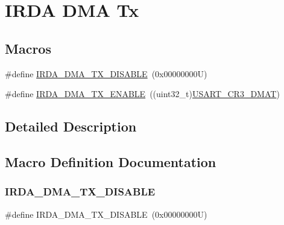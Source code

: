 \hypertarget{group___i_r_d_a___d_m_a___tx}{}\section{I\+R\+DA D\+MA Tx}
\label{group___i_r_d_a___d_m_a___tx}
\subsection*{Macros}
\begin{DoxyCompactItemize}
\item 
\#define \hyperlink{group___i_r_d_a___d_m_a___tx_ga9e023ad9d465b2ff0c75fe515e8a65f7}{I\+R\+D\+A\+\_\+\+D\+M\+A\+\_\+\+T\+X\+\_\+\+D\+I\+S\+A\+B\+LE}~(0x00000000\+U)
\item 
\#define \hyperlink{group___i_r_d_a___d_m_a___tx_ga4e8223148a583093a0af5c2e60e75270}{I\+R\+D\+A\+\_\+\+D\+M\+A\+\_\+\+T\+X\+\_\+\+E\+N\+A\+B\+LE}~((uint32\+\_\+t)\hyperlink{group___peripheral___registers___bits___definition_ga5bb515d3814d448f84e2c98bf44f3993}{U\+S\+A\+R\+T\+\_\+\+C\+R3\+\_\+\+D\+M\+AT})
\end{DoxyCompactItemize}


\subsection{Detailed Description}


\subsection{Macro Definition Documentation}
\mbox{\label{group___i_r_d_a___d_m_a___tx_ga9e023ad9d465b2ff0c75fe515e8a65f7}} 
\subsubsection{\texorpdfstring{I\+R\+D\+A\+\_\+\+D\+M\+A\+\_\+\+T\+X\+\_\+\+D\+I\+S\+A\+B\+LE}{IRDA\_DMA\_TX\_DISABLE}}
{\footnotesize\ttfamily \#define I\+R\+D\+A\+\_\+\+D\+M\+A\+\_\+\+T\+X\+\_\+\+D\+I\+S\+A\+B\+LE~(0x00000000\+U)}

